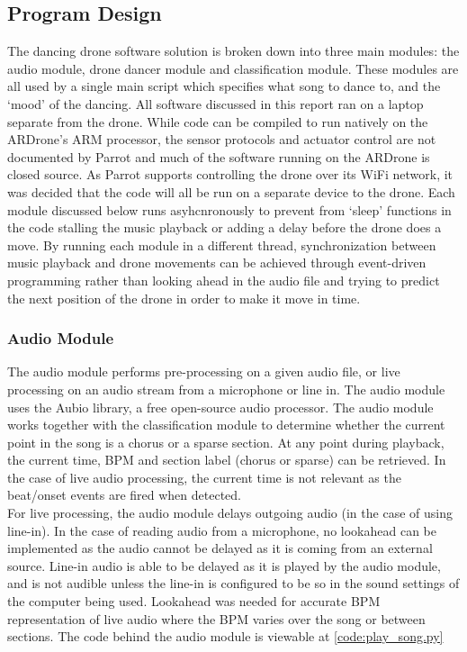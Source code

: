 \subsection{Program Design}

The dancing drone software solution is broken down into three main modules: the audio module, drone dancer
module and classification module. These modules are all used by a single main script which specifies
what song to dance to, and the `mood' of the dancing. All software discussed in this report ran on a laptop
separate from the drone. While code can be compiled to run natively on the ARDrone's ARM processor, the
sensor protocols and actuator control are not documented by Parrot and much of the software running on the
ARDrone is closed source. As Parrot supports controlling the drone over its WiFi network, it was decided that the
code will all be run on a separate device to the drone. Each module discussed below runs asyhcnronously to
prevent from `sleep' functions in the code stalling the music playback or adding a delay before the drone does a
move. By running each module in a different thread, synchronization between music playback and drone movements
can be achieved through event-driven programming rather than looking ahead in the audio file and trying to
predict the next position of the drone in order to make it move in time.\\

\subsubsection{Audio Module}
The audio module performs pre-processing on a given audio file, or live processing on an audio stream from a
microphone or line in. The audio module uses the Aubio library, a free open-source audio processor. The audio module works
together with the classification module to determine whether the current point in the song is a chorus or a
sparse section. At any point during playback, the current time, BPM and section label (chorus or sparse) can be
retrieved. In the case of live audio processing, the current time is not relevant as the beat/onset events are fired
when detected. \\

For live processing, the audio module delays outgoing audio (in the case of using line-in). In the case of
reading audio from a microphone, no lookahead can be implemented as the audio cannot be delayed as it is coming
from an external source. Line-in audio is able to be delayed as it is played by the audio module, and is
not audible unless the line-in is configured to be so in the sound settings of the computer being used. Lookahead
was needed for accurate BPM representation of live audio where the BPM varies over the song or between sections. The code behind the audio module is viewable at \eqref{code:play_song.py}\\


